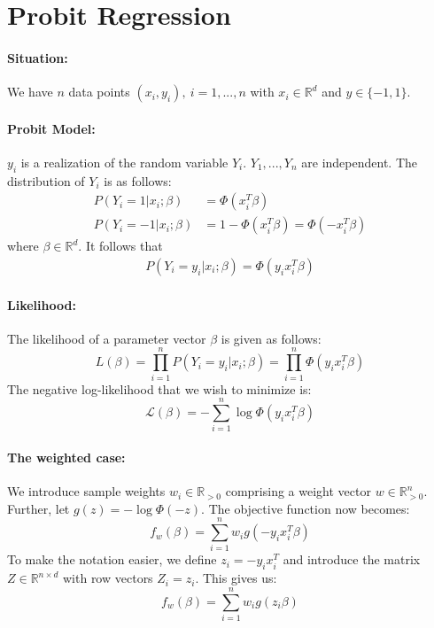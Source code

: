 \section{Probit Regression}

\paragraph{Situation:}
We have $n$ data points $(x_i, y_i), \ i=1,...,n$ with
$x_i \in \mathbb{R}^d$ and $y \in \{ -1, 1\}$.

\paragraph{Probit Model:}
$y_i$ is a realization of the random variable $Y_i$.
$Y_1, ..., Y_n$ are independent.
The distribution of $Y_i$ is as follows:
\begin{align*}
    P(Y_i = 1 | x_i; \beta)  & = \Phi(x_i^T \beta)                          \\
    P(Y_i = -1 | x_i; \beta) & = 1 - \Phi(x_i^T \beta) = \Phi(-x_i^T \beta)
\end{align*}
where $\beta \in \mathbb{R}^d$.
It follows that
\begin{align*}
    P(Y_i = y_i | x_i; \beta) = \Phi(y_i x_i^T \beta)
\end{align*}

\paragraph{Likelihood:}
The likelihood of a parameter vector $\beta$ is given as follows:
\begin{equation*}
    L(\beta) = \prod_{i=1}^n P(Y_i = y_i | x_i; \beta) = \prod_{i=1}^n \Phi(y_i x_i^T \beta)
\end{equation*}
The negative log-likelihood that we wish to minimize is:
\begin{equation*}
    \mathcal{L}(\beta) = -\sum_{i=1}^n \log \Phi(y_i x_i^T \beta)
\end{equation*}

\paragraph{The weighted case:}
We introduce sample weights $w_i \in \mathbb{R}_{>0}$
comprising a weight vector $w \in \mathbb{R}_{>0}^n$.
Further, let $g(z) = -\log \Phi(-z)$.
The objective function now becomes:
\begin{equation*}
    f_w(\beta) = \sum_{i=1}^n w_i g(-y_i x_i^T \beta)
\end{equation*}
To make the notation easier, we define $z_i = -y_i x_i^T$ and introduce
the matrix $Z \in \mathbb{R}^{n \times d}$ with row vectors $Z_i = z_i$.
This gives us:
\begin{equation*}
    f_w(\beta) = \sum_{i=1}^n w_i g(z_i \beta)
\end{equation*}

